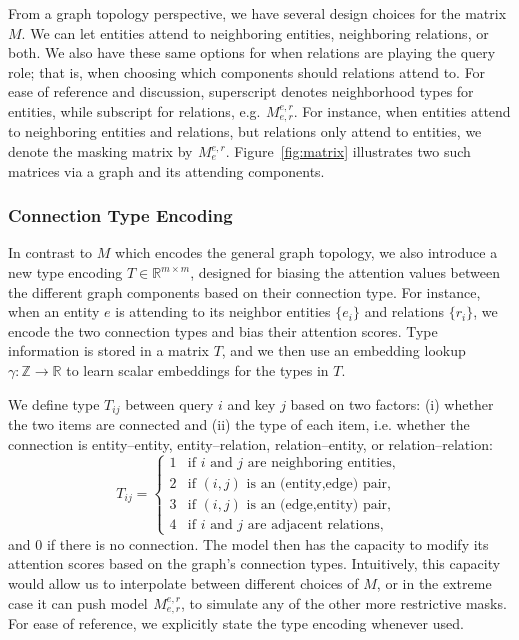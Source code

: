 \documentclass[11pt]{article}
\begin{document}
From a graph topology perspective, we have several design choices for the matrix $M$. We can let entities attend to neighboring entities, neighboring relations, or both. We also have these same options for when relations are playing the query role; that is, when choosing which components should relations attend to. For ease of reference and discussion, superscript denotes neighborhood types for entities, while subscript for relations, e.g. ${}^{}_{}M^{e,r}_{e,r}$.
For instance, when entities attend to neighboring entities and relations, but relations only attend to entities, we denote the masking matrix by $ {}^{}_{}M^{e,r}_{e} $. Figure~\ref{fig:matrix} illustrates two such matrices via a graph and its attending components.




\subsubsection{Connection Type Encoding}
In contrast to $M$ which encodes the general graph topology, we also introduce a new type encoding $T \in \mathbb{R}^{m \times m}$, designed for biasing the attention values between the different graph components based on their connection type.
For instance, when an entity $e$ is attending to its neighbor entities $\{e_i\}$ and relations $\{r_i\}$, we encode the two connection types and bias their attention scores. 
Type information is stored in a matrix $T$, and we then use an embedding lookup $\gamma: \mathbb{Z} \to \mathbb{R}$ to learn scalar embeddings for the types in $T$.


We define type $T_{ij}$ between query $i$ and key $j$ based on two factors: (i) whether the two items are connected and (ii) the type of each item, i.e. whether the connection is entity--entity, entity--relation, relation--entity, or relation--relation:
\begin{equation}
\label{eq:types}
T_{ij} = 
    \begin{cases}
    1 &\text{if } i \text{ and } j \text{ are neighboring entities}, \\
     2 &\text{if } (i, j) \text{ is an (entity,edge) pair}, \\
      3 &\text{if } (i, j) \text{ is an (edge,entity) pair}, \\
    4 &\text{if } i \text{ and } j \text{ are adjacent relations},
    \end{cases}
\end{equation}
and 0 if there is no connection.
The model then has the capacity to modify its attention scores based on the graph's connection types. Intuitively, this capacity would allow us to interpolate between different choices of $M$, or in the extreme case it can push model $ {}^{}_{}M^{e,r}_{e,r} $, to simulate any of the other more restrictive masks.
For ease of reference, we explicitly state the type encoding whenever used.
\end{document}
